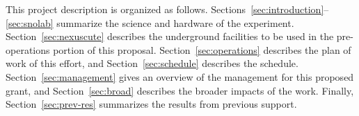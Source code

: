  This project description is organized as follows. 
Sections~\ref{sec:introduction}--\ref{sec:snolab} summarize the science and hardware of the \scs experiment. 
Section~\ref{sec:nexuscute} describes the underground facilities to be used in the pre-operations portion of this proposal.
Section~\ref{sec:operations} describes the plan of work of this effort, and Section~\ref{sec:schedule} describes the schedule.
Section~\ref{sec:management} gives an overview of the management for this proposed grant, and Section~\ref{sec:broad} describes the broader impacts of the work.
Finally, Section~\ref{sec:prev-res} summarizes the results from previous support.

